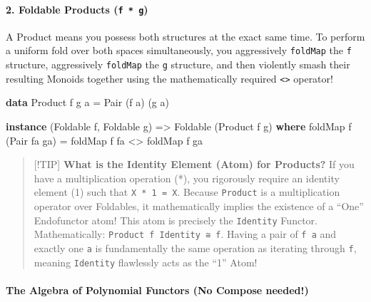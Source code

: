\documentclass[
]{article}
\newenvironment{Shaded}{}{}
\newcommand{\DataTypeTok}[1]{\textcolor[rgb]{0.56,0.13,0.00}{#1}}
\newcommand{\FunctionTok}[1]{\textcolor[rgb]{0.02,0.16,0.49}{#1}}
\newcommand{\KeywordTok}[1]{\textcolor[rgb]{0.00,0.44,0.13}{\textbf{#1}}}
\newcommand{\NormalTok}[1]{#1}
\newcommand{\OperatorTok}[1]{\textcolor[rgb]{0.40,0.40,0.40}{#1}}
\newcommand{\OtherTok}[1]{\textcolor[rgb]{0.00,0.44,0.13}{#1}}
\begin{document}
\paragraph{\texorpdfstring{2. Foldable Products
(\texttt{f\ *\ g})}{2. Foldable Products (f * g)}}\label{foldable-products-f-g}

A Product means you possess both structures at the exact same time. To
perform a uniform fold over both spaces simultaneously, you aggressively
\texttt{foldMap} the \texttt{f} structure, aggressively \texttt{foldMap}
the \texttt{g} structure, and then violently smash their resulting
Monoids together using the mathematically required
\texttt{\textless{}\textgreater{}} operator!

\begin{Shaded}
\begin{Highlighting}[]
\KeywordTok{data} \DataTypeTok{Product}\NormalTok{ f g a }\OtherTok{=} \DataTypeTok{Pair}\NormalTok{ (f a) (g a)}

\KeywordTok{instance}\NormalTok{ (}\DataTypeTok{Foldable}\NormalTok{ f, }\DataTypeTok{Foldable}\NormalTok{ g) }\OtherTok{=\textgreater{}} \DataTypeTok{Foldable}\NormalTok{ (}\DataTypeTok{Product}\NormalTok{ f g) }\KeywordTok{where}
    \FunctionTok{foldMap}\NormalTok{ f (}\DataTypeTok{Pair}\NormalTok{ fa ga) }\OtherTok{=} \FunctionTok{foldMap}\NormalTok{ f fa }\OperatorTok{\textless{}\textgreater{}} \FunctionTok{foldMap}\NormalTok{ f ga}
\end{Highlighting}
\end{Shaded}

\begin{quote}
{[}!TIP{]} \textbf{What is the Identity Element (Atom) for Products?} If
you have a multiplication operation (*), you rigorously require an
identity element (1) such that \texttt{X\ *\ 1\ =\ X}. Because
\texttt{Product} is a multiplication operator over Foldables, it
mathematically implies the existence of a ``One'' Endofunctor atom! This
atom is precisely the \texttt{Identity} Functor. Mathematically:
\texttt{Product\ f\ Identity\ ≅\ f}. Having a pair of \texttt{f\ a} and
exactly one \texttt{a} is fundamentally the same operation as iterating
through \texttt{f}, meaning \texttt{Identity} flawlessly acts as the
``1'' Atom!
\end{quote}

\paragraph{The Algebra of Polynomial Functors (No Compose
needed!)}\label{the-algebra-of-polynomial-functors-no-compose-needed}
\end{document}
